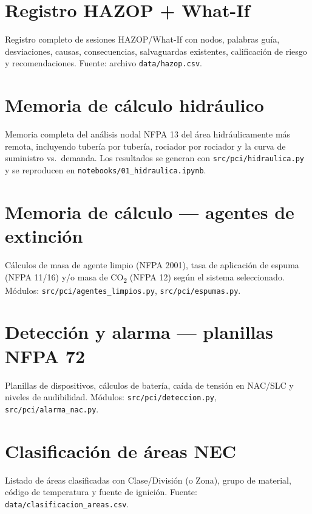 \appendix

\section{Registro HAZOP + What-If}
\label{appendix:hazop}

Registro completo de sesiones HAZOP/What-If con nodos, palabras guía, desviaciones, causas, consecuencias, salvaguardas existentes, calificación de riesgo y recomendaciones. Fuente: archivo \texttt{data/hazop.csv}.

\section{Memoria de cálculo hidráulico}
\label{appendix:hidraulica}

Memoria completa del análisis nodal NFPA 13 del área hidráulicamente más remota, incluyendo tubería por tubería, rociador por rociador y la curva de suministro vs.\ demanda. Los resultados se generan con \texttt{src/pci/hidraulica.py} y se reproducen en \texttt{notebooks/01\_hidraulica.ipynb}.

\section{Memoria de cálculo — agentes de extinción}
\label{appendix:agentes}

Cálculos de masa de agente limpio (NFPA 2001), tasa de aplicación de espuma (NFPA 11/16) y/o masa de CO\textsubscript{2} (NFPA 12) según el sistema seleccionado. Módulos: \texttt{src/pci/agentes\_limpios.py}, \texttt{src/pci/espumas.py}.

\section{Detección y alarma — planillas NFPA 72}
\label{appendix:deteccion}

Planillas de dispositivos, cálculos de batería, caída de tensión en NAC/SLC y niveles de audibilidad. Módulos: \texttt{src/pci/deteccion.py}, \texttt{src/pci/alarma\_nac.py}.

\section{Clasificación de áreas NEC}
\label{appendix:clasificacion}

Listado de áreas clasificadas con Clase/División (o Zona), grupo de material, código de temperatura y fuente de ignición. Fuente: \texttt{data/clasificacion\_areas.csv}.

